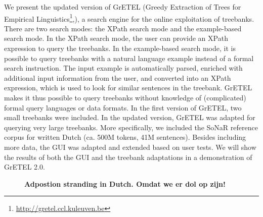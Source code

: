 \documentclass[10pt, a4paper, twopage, headinclude, footinclude, BCOR5mm]{scrartcl}
\begin{document}
        \begin{table}[t!]
    \end{table}

\noindent
We present the updated version of GrETEL (Greedy Extraction of Trees for Empirical Linguistics\footnote{\url{ http://gretel.ccl.kuleuven.be}},), a search engine for the online exploitation of treebanks. There are two search modes: the XPath search mode and the example-based search mode. In the XPath search mode, the user can provide an XPath expression to query the treebanks. In the example-based search mode, it is possible to query treebanks with a natural language example instead of a formal search instruction. The input example is automatically parsed, enriched with additional input information from the user, and converted into an XPath expression, which is used to look for similar sentences in the treebank. GrETEL makes it thus possible to query treebanks without knowledge of (complicated) formal query languages or data formats.  In the first version of GrETEL, two small treebanks were included. In the updated version, GrETEL was adapted for querying very large treebanks. More specifically, we included the SoNaR reference corpus for written Dutch (ca. 500M tokens, 41M sentences).  Besides including more data, the GUI was adapted and extended based on user tests. We will show the results of both the GUI and the treebank adaptations in a demonstration of GrETEL 2.0.


\newpage

\begin{figure}[t!]
\centering
\large\textbf{Adpostion stranding in Dutch. Omdat we er dol op zijn!}
\vspace*{0.5cm}
\end{figure}
\end{document}

